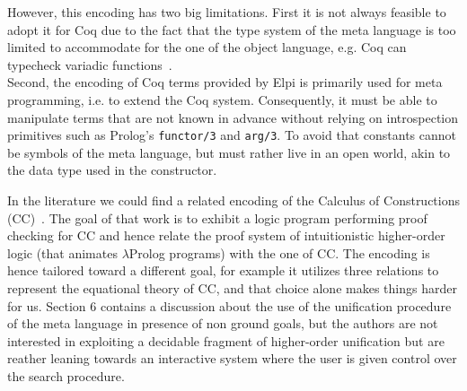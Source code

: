 \documentclass[sigconf,natbib=false,review]{acmart}
\begin{document}
\noindent
However, this encoding has two big limitations. First it is
not always feasible to adopt it for Coq due to the fact that the type system
of the meta language is too limited to accommodate for the one of the object language,
e.g. Coq can typecheck variadic functions~\cite{cpdt}. \\
Second, the encoding of Coq terms provided by Elpi is primarily used for meta
programming, i.e. to extend the Coq system. Consequently, it must be able to
manipulate terms that are not known in advance
without relying on introspection primitives such as Prolog's
\texttt{functor/3} and \texttt{arg/3}. To avoid that constants 
cannot be symbols of the meta language, but must rather
live in
an open world, akin to the  data type used in the 
constructor.

In the literature we could find a related encoding of the Calculus of
Constructions (CC)~\cite{felty93lics}. The goal of that work is to exhibit
a logic program performing proof checking for CC and hence relate the
proof system of intuitionistic higher-order logic (that animates $\lambda$Prolog
programs) with the one of CC. The encoding is hence tailored
toward a different goal, for example it utilizes three relations to represent the
equational theory of CC, and that choice alone makes things harder for us.
Section 6 contains a discussion about the use of the
unification procedure of the meta language in presence of non ground goals, but
the authors are not interested in exploiting a decidable fragment of
higher-order unification but are reather leaning towards an interactive
system where the user is given
control over the search procedure.
\end{document}

